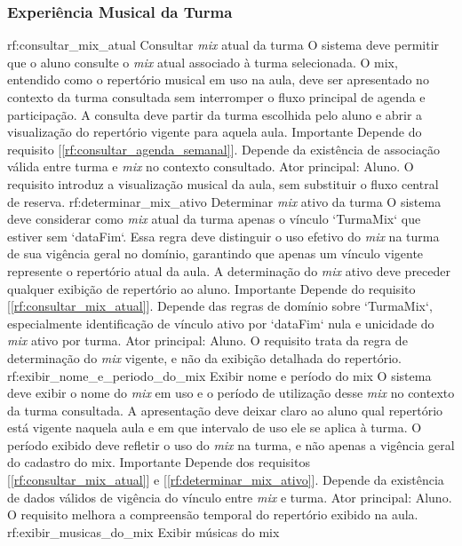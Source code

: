 \subsubsection*{Experiência Musical da Turma}
\reqfuncfull
{rf:consultar_mix_atual}
{Consultar \textit{mix} atual da turma}
{O sistema deve permitir que o aluno consulte o \textit{mix} atual associado à turma selecionada. O mix, entendido como o repertório musical em uso na aula, deve ser apresentado no contexto da turma consultada sem interromper o fluxo principal de agenda e participação. A consulta deve partir da turma escolhida pelo aluno e abrir a visualização do repertório vigente para aquela aula.}
{Importante}
{Depende do requisito [\ref{rf:consultar_agenda_semanal}]. Depende da existência de associação válida entre turma e \textit{mix} no contexto consultado.}
{Ator principal: Aluno. O requisito introduz a visualização musical da aula, sem substituir o fluxo central de reserva.}
\reqfuncfull
{rf:determinar_mix_ativo}
{Determinar \textit{mix} ativo da turma}
{O sistema deve considerar como \textit{mix} atual da turma apenas o vínculo `TurmaMix` que estiver sem `dataFim`. Essa regra deve distinguir o uso efetivo do \textit{mix} na turma de sua vigência geral no domínio, garantindo que apenas um vínculo vigente represente o repertório atual da aula. A determinação do \textit{mix} ativo deve preceder qualquer exibição de repertório ao aluno.}
{Importante}
{Depende do requisito [\ref{rf:consultar_mix_atual}]. Depende das regras de domínio sobre `TurmaMix`, especialmente identificação de vínculo ativo por `dataFim` nula e unicidade do \textit{mix} ativo por turma.}
{Ator principal: Aluno. O requisito trata da regra de determinação do \textit{mix} vigente, e não da exibição detalhada do repertório.}
\reqfuncfull
{rf:exibir_nome_e_periodo_do_mix}
{Exibir nome e período do mix}
{O sistema deve exibir o nome do \textit{mix} em uso e o período de utilização desse \textit{mix} no contexto da turma consultada. A apresentação deve deixar claro ao aluno qual repertório está vigente naquela aula e em que intervalo de uso ele se aplica à turma. O período exibido deve refletir o uso do \textit{mix} na turma, e não apenas a vigência geral do cadastro do mix.}
{Importante}
{Depende dos requisitos [\ref{rf:consultar_mix_atual}] e [\ref{rf:determinar_mix_ativo}]. Depende da existência de dados válidos de vigência do vínculo entre \textit{mix} e turma.}
{Ator principal: Aluno. O requisito melhora a compreensão temporal do repertório exibido na aula.}
\reqfuncfull
{rf:exibir_musicas_do_mix}
{Exibir músicas do mix}
